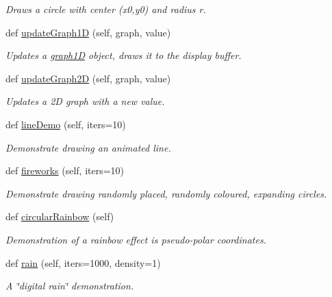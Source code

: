 \begin{DoxyCompactItemize}
\begin{DoxyCompactList}\small\item\em Draws a circle with center (x0,y0) and radius r. \end{DoxyCompactList}\item 
def \hyperlink{classglowbit_1_1glowbitMatrix_a0d44976cdc12728d9ae80c2d901029c0}{update\+Graph1D} (self, graph, value)
\begin{DoxyCompactList}\small\item\em Updates a \hyperlink{classglowbit_1_1glowbitMatrix_1_1graph1D}{graph1D} object, draws it to the display buffer. \end{DoxyCompactList}\item 
def \hyperlink{classglowbit_1_1glowbitMatrix_ae9083babec0d5004363782540b60baed}{update\+Graph2D} (self, graph, value)
\begin{DoxyCompactList}\small\item\em Updates a 2D graph with a new value. \end{DoxyCompactList}\item 
\mbox{\label{classglowbit_1_1glowbitMatrix_a0071fd8471e5f519586f6fdd86f8d7f3}} 
def \hyperlink{classglowbit_1_1glowbitMatrix_a0071fd8471e5f519586f6fdd86f8d7f3}{line\+Demo} (self, iters=10)
\begin{DoxyCompactList}\small\item\em Demonstrate drawing an animated line. \end{DoxyCompactList}\item 
def \hyperlink{classglowbit_1_1glowbitMatrix_a69370ec1479b4887fca517fbefd92e4c}{fireworks} (self, iters=10)
\begin{DoxyCompactList}\small\item\em Demonstrate drawing randomly placed, randomly coloured, expanding circles. \end{DoxyCompactList}\item 
def \hyperlink{classglowbit_1_1glowbitMatrix_adf29bdb4294bcf27ae560130b0fcae35}{circular\+Rainbow} (self)
\begin{DoxyCompactList}\small\item\em Demonstration of a rainbow effect is pseudo-\/polar coordinates. \end{DoxyCompactList}\item 
def \hyperlink{classglowbit_1_1glowbitMatrix_a690a172f923caeb55e3adf012ec0600c}{rain} (self, iters=1000, density=1)
\begin{DoxyCompactList}\small\item\em A \char`\"{}digital rain\char`\"{} demonstration. \end{DoxyCompactList}\item 

\end{DoxyCompactItemize}

